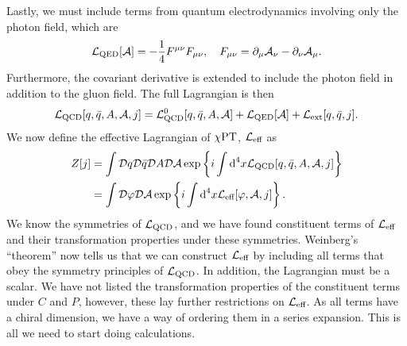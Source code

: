 Lastly, we must include terms from quantum electrodynamics involving only the photon field, which are
%
\begin{equation}
    \mathcal{L}_\text{QED}[\mathcal A] 
    = -\frac{1}{4} F^{\mu \nu}F_{\mu \nu}, \quad
    F_{\mu \nu} = \partial_{\mu}\mathcal A_{\nu} - \partial_{\nu}\mathcal A_{\mu}.
\end{equation}
%
Furthermore, the covariant derivative is extended to include the photon field in addition to the gluon field.
The full Lagrangian is then
%
\begin{equation}
    \mathcal{L}_\text{QCD}[q, \bar q, A,\mathcal A, j] 
    = \mathcal{L}_\text{QCD}^0[q, \bar q, A, \mathcal A] 
    + \mathcal{L}_\text{QED}[\mathcal A] + \mathcal{L}_\text{ext}[q, \bar q, j].
\end{equation}
%
We now define the effective Lagrangian of $\chi \text{PT}$, $\mathcal{L}_\text{eff}$ as
%
\begin{align}
    \nonumber
    Z[j]
    & = 
    \int \mathcal D q \mathcal D \bar q \mathcal D A \mathcal D \mathcal A\,
    \text{exp} \left\{ i\int \text{d}^4 x \mathcal{L}_\text{QCD}[q, \bar q, A, \mathcal A, j]  \right\}\\
    & = 
    \int \mathcal D \varphi \mathcal D \mathcal A\,
    \text{exp} \left\{ i\int \text{d}^4 x \mathcal{L}_\text{eff}[\varphi, \mathcal{A}, j]  \right\}.
    \label{definition effective Lagrangian chpt}
\end{align}
%
We know the symmetries of $\mathcal{L}_\text{QCD}$, and we have found constituent terms of $\mathcal{L}_\text{eff}$ and their transformation properties under these symmetries.
Weinberg's ``theorem'' now tells us that we can construct $\mathcal{L}_\text{eff}$ by including all terms that obey the symmetry principles of $\mathcal{L}_\text{QCD}$.
In addition, the Lagrangian must be a scalar.
We have not listed the transformation properties of the constituent terms under $C$ and $P$, however, these lay further restrictions on $\mathcal{L}_\text{eff}$.
As all terms have a chiral dimension, we have a way of ordering them in a series expansion.
This is all we need to start doing calculations.

